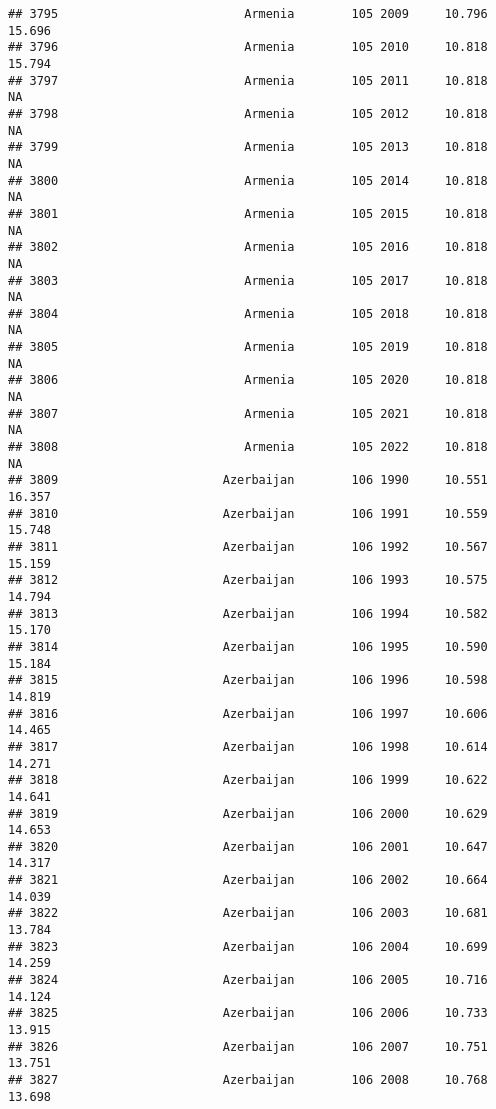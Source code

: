 \documentclass[
]{article}
\begin{document}
\begin{verbatim}
## 3795                          Armenia        105 2009     10.796     15.696
## 3796                          Armenia        105 2010     10.818     15.794
## 3797                          Armenia        105 2011     10.818         NA
## 3798                          Armenia        105 2012     10.818         NA
## 3799                          Armenia        105 2013     10.818         NA
## 3800                          Armenia        105 2014     10.818         NA
## 3801                          Armenia        105 2015     10.818         NA
## 3802                          Armenia        105 2016     10.818         NA
## 3803                          Armenia        105 2017     10.818         NA
## 3804                          Armenia        105 2018     10.818         NA
## 3805                          Armenia        105 2019     10.818         NA
## 3806                          Armenia        105 2020     10.818         NA
## 3807                          Armenia        105 2021     10.818         NA
## 3808                          Armenia        105 2022     10.818         NA
## 3809                       Azerbaijan        106 1990     10.551     16.357
## 3810                       Azerbaijan        106 1991     10.559     15.748
## 3811                       Azerbaijan        106 1992     10.567     15.159
## 3812                       Azerbaijan        106 1993     10.575     14.794
## 3813                       Azerbaijan        106 1994     10.582     15.170
## 3814                       Azerbaijan        106 1995     10.590     15.184
## 3815                       Azerbaijan        106 1996     10.598     14.819
## 3816                       Azerbaijan        106 1997     10.606     14.465
## 3817                       Azerbaijan        106 1998     10.614     14.271
## 3818                       Azerbaijan        106 1999     10.622     14.641
## 3819                       Azerbaijan        106 2000     10.629     14.653
## 3820                       Azerbaijan        106 2001     10.647     14.317
## 3821                       Azerbaijan        106 2002     10.664     14.039
## 3822                       Azerbaijan        106 2003     10.681     13.784
## 3823                       Azerbaijan        106 2004     10.699     14.259
## 3824                       Azerbaijan        106 2005     10.716     14.124
## 3825                       Azerbaijan        106 2006     10.733     13.915
## 3826                       Azerbaijan        106 2007     10.751     13.751
## 3827                       Azerbaijan        106 2008     10.768     13.698

\end{verbatim}
\end{document}
